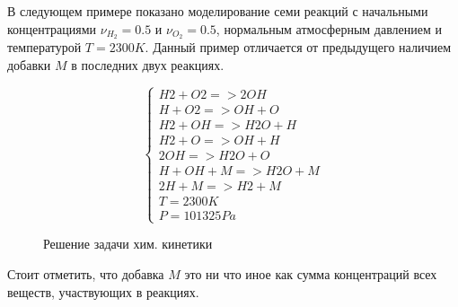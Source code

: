 В следующем примере показано моделирование семи реакций с начальными концентрациями $\nu_{H_2} = 0.5$ и $\nu_{O_2} = 0.5$, нормальным
атмосферным давлением и температурой $T = 2300K$. Данный пример отличается от предыдущего наличием добавки $M$ в последних двух реакциях.


$$
\begin{cases}
    H2 + O2 => 2OH\\
    H + O2 => OH + O\\
    H2 + OH => H2O + H\\
    H2 + O => OH + H\\
    2OH => H2O + O\\
    H + OH + M => H2O + M\\
    2H + M => H2 + M\\
    T = 2300K\\
    P = 101325Pa
\end{cases}
$$

\begin{figure}
    
    \caption{Решение задачи хим. кинетики}
    \label{fig:chem2}
\end{figure}

Стоит отметить, что добавка $M$ это ни что иное как сумма концентраций всех веществ, участвующих в реакциях.